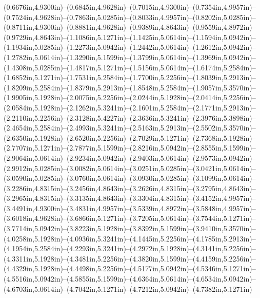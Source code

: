 (0.6676in,4.9300in)--(0.6845in,4.9628in)--(0.7015in,4.9300in)--(0.7354in,4.9957in)--(0.7524in,4.9628in)--(0.7863in,5.0285in)--(0.8033in,4.9957in)--(0.8202in,5.0285in)--(0.8711in,4.9300in)--(0.8881in,4.9628in)--(0.9389in,4.8643in)--(0.9559in,4.8972in)--(0.9729in,4.8643in)--(1.1086in,5.1271in)--(1.1425in,5.0614in)--(1.1594in,5.0942in)--(1.1934in,5.0285in)--(1.2273in,5.0942in)--(1.2442in,5.0614in)--(1.2612in,5.0942in)--(1.2782in,5.0614in)--(1.3290in,5.1599in)--(1.3799in,5.0614in)--(1.3969in,5.0942in)--(1.4308in,5.0285in)--(1.4817in,5.1271in)--(1.5156in,5.0614in)--(1.6174in,5.2584in)--(1.6852in,5.1271in)--(1.7531in,5.2584in)--(1.7700in,5.2256in)--(1.8039in,5.2913in)--(1.8209in,5.2584in)--(1.8379in,5.2913in)--(1.8548in,5.2584in)--(1.9057in,5.3570in)--(1.9905in,5.1928in)--(2.0075in,5.2256in)--(2.0244in,5.1928in)--(2.0414in,5.2256in)--(2.0584in,5.1928in)--(2.1262in,5.3241in)--(2.1601in,5.2584in)--(2.1771in,5.2913in)--(2.2110in,5.2256in)--(2.3128in,5.4227in)--(2.3636in,5.3241in)--(2.3976in,5.3898in)--(2.4654in,5.2584in)--(2.4993in,5.3241in)--(2.5163in,5.2913in)--(2.5502in,5.3570in)--(2.6350in,5.1928in)--(2.6520in,5.2256in)--(2.7029in,5.1271in)--(2.7368in,5.1928in)--(2.7707in,5.1271in)--(2.7877in,5.1599in)--(2.8216in,5.0942in)--(2.8555in,5.1599in)--(2.9064in,5.0614in)--(2.9234in,5.0942in)--(2.9403in,5.0614in)--(2.9573in,5.0942in)--(2.9912in,5.0285in)--(3.0082in,5.0614in)--(3.0251in,5.0285in)--(3.0421in,5.0614in)--(3.0590in,5.0285in)--(3.0760in,5.0614in)--(3.0930in,5.0285in)--(3.1099in,5.0614in)--(3.2286in,4.8315in)--(3.2456in,4.8643in)--(3.2626in,4.8315in)--(3.2795in,4.8643in)--(3.2965in,4.8315in)--(3.3135in,4.8643in)--(3.3304in,4.8315in)--(3.4152in,4.9957in)--(3.4491in,4.9300in)--(3.4831in,4.9957in)--(3.5339in,4.8972in)--(3.5848in,4.9957in)--(3.6018in,4.9628in)--(3.6866in,5.1271in)--(3.7205in,5.0614in)--(3.7544in,5.1271in)--(3.7714in,5.0942in)--(3.8223in,5.1928in)--(3.8392in,5.1599in)--(3.9410in,5.3570in)--(4.0258in,5.1928in)--(4.0936in,5.3241in)--(4.1445in,5.2256in)--(4.1785in,5.2913in)--(4.1954in,5.2584in)--(4.2293in,5.3241in)--(4.2972in,5.1928in)--(4.3141in,5.2256in)--(4.3311in,5.1928in)--(4.3481in,5.2256in)--(4.3820in,5.1599in)--(4.4159in,5.2256in)--(4.4329in,5.1928in)--(4.4498in,5.2256in)--(4.5177in,5.0942in)--(4.5346in,5.1271in)--(4.5516in,5.0942in)--(4.5855in,5.1599in)--(4.6364in,5.0614in)--(4.6534in,5.0942in)--(4.6703in,5.0614in)--(4.7042in,5.1271in)--(4.7212in,5.0942in)--(4.7382in,5.1271in) 